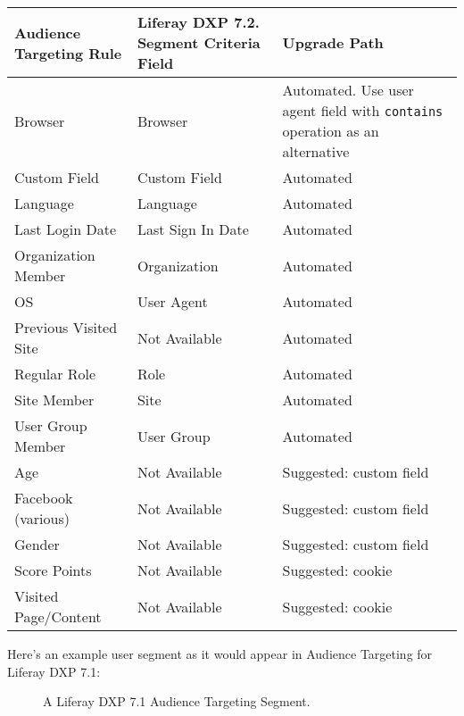 \begin{longtable}[]{@{}
  >{\raggedright\arraybackslash}p{}
  >{\raggedright\arraybackslash}p{}
  >{\raggedright\arraybackslash}p{}@{}}
\toprule\noalign{}
\begin{minipage}[b]{\linewidth}\raggedright
Audience Targeting Rule
\end{minipage} & \begin{minipage}[b]{\linewidth}\raggedright
Liferay DXP 7.2. Segment Criteria Field
\end{minipage} & \begin{minipage}[b]{\linewidth}\raggedright
Upgrade Path
\end{minipage} \\
\midrule\noalign{}
\endhead
\bottomrule\noalign{}
\endlastfoot
Browser & Browser & Automated. Use user agent field with
\texttt{contains} operation as an alternative \\
Custom Field & Custom Field & Automated \\
Language & Language & Automated \\
Last Login Date & Last Sign In Date & Automated \\
Organization Member & Organization & Automated \\
OS & User Agent & Automated \\
Previous Visited Site & Not Available & Automated \\
Regular Role & Role & Automated \\
Site Member & Site & Automated \\
User Group Member & User Group & Automated \\
Age & Not Available & Suggested: custom field \\
Facebook (various) & Not Available & Suggested: custom field \\
Gender & Not Available & Suggested: custom field \\
Score Points & Not Available & Suggested: cookie \\
Visited Page/Content & Not Available & Suggested: cookie \\
\end{longtable}

\noindent\hrulefill

Here's an example user segment as it would appear in Audience Targeting
for Liferay DXP 7.1:

\begin{figure}
\centering
{}
\caption{A Liferay DXP 7.1 Audience Targeting Segment.}
\end{figure}

